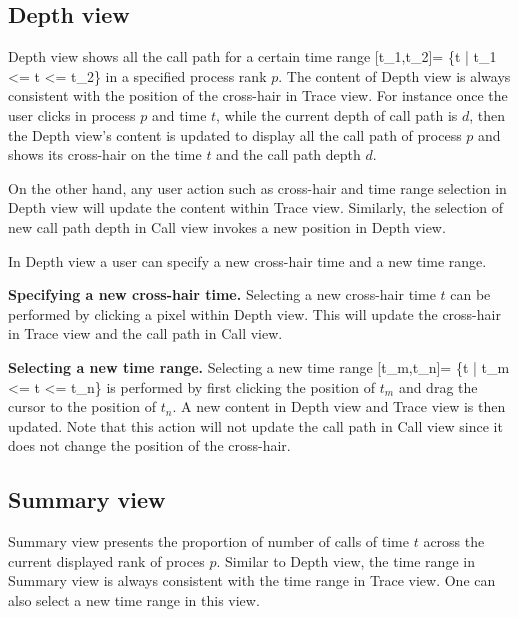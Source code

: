 \documentclass[english]{article}
\begin{document}
\subsection{Depth view}

Depth view shows all the call path for a certain time range [t_1,t_2]= \{t | t_1 <= t <= t_2\} in a specified process rank $p$. The content of Depth view is always consistent with the position of the cross-hair in Trace view.
For instance once the user clicks in process $p$ and time $t$, while the current depth of call path is $d$, then the Depth view's content is updated to display all the call path of process $p$ and shows its cross-hair on the time $t$ and the call path depth $d$.

On the other hand, any user action such as cross-hair and time range selection in Depth view will update the content within Trace view. Similarly, the selection of new call path depth in Call view invokes a new position in Depth view.

In Depth view a user can specify a new cross-hair time and a new time range.

\textbf{Specifying a new cross-hair time.} Selecting a new cross-hair time $t$ can be performed by clicking a pixel within Depth view. This will update the cross-hair in Trace view and the call path in Call view.

\textbf{Selecting a new time range.} Selecting a new time range [t_m,t_n]= \{t | t_m <= t <= t_n\} is performed by first clicking the position of $t_m$ and drag the cursor to the position of $t_n$. A new content in Depth view and Trace view is then updated. Note that this action will not update the call path in Call view since it does not change the position of the cross-hair.


\subsection{Summary view}

Summary view presents the proportion of number of calls of time $t$ across the current displayed rank of proces $p$.
Similar to Depth view, the time range in Summary view is always consistent with the time range in Trace view.
One can also select a new time range in this view.
\end{document}
